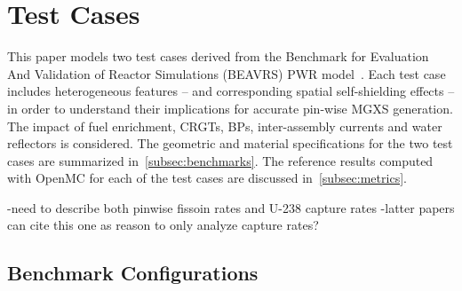 \section{Test Cases}
\label{sec:Test Cases}

This paper models two test cases derived from the Benchmark for Evaluation And Validation of Reactor Simulations (BEAVRS) PWR model~\citep{horelik2013beavrs}. Each test case includes heterogeneous features -- and corresponding spatial self-shielding effects -- in order to understand their implications for accurate pin-wise MGXS generation. The impact of fuel enrichment, CRGTs, BPs, inter-assembly currents and water reflectors is considered. The geometric and material specifications for the two test cases are summarized in~\autoref{subsec:benchmarks}. The reference results computed with OpenMC for each of the test cases are discussed in~\autoref{subsec:metrics}.

-need to describe both pinwise fissoin rates and U-238 capture rates
  -latter papers can cite this one as reason to only analyze capture rates?


\subsection{Benchmark Configurations}
\label{subsec:benchmarks}

